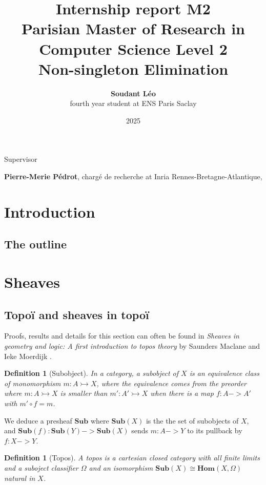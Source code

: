 \documentclass{article}
\title{Internship report M2\\ Parisian Master of Research in Computer Science Level 
2\vspace{1cm}\\  Non-singleton Elimination\\}
\author{\textbf{Soudant L\'eo}\\ fourth year student at ENS Paris Saclay}
\date{2025}
\newtheorem{definition}[theorem]{Definition}
\newcommand{\0}{\mathbf{0}}
\newcommand{\1}{\mathbf{1}}
\newcommand{\mono}{\rightarrowtail}
\begin{document}
\begin{titlepage}
    \maketitle
    \centering
    Supervisor
    
    \textbf{Pierre-Merie P\'edrot}, chargé de recherche at Inria Rennes-Bretagne-Atlantique, 

\end{titlepage}

\begin{abstract}
\end{abstract}
\tableofcontents
\newpage


\section{Introduction}




\subsection{The outline}

\section{Sheaves}
\subsection{Topoï and sheaves in topoï}


Proofs, results and details for this section can often be found in \emph{Sheaves in geometry and logic: A first introduction to topos theory} by Saunders Maclane and Ieke Moerdijk \cite{maclane2012sheaves}.

\begin{definition}[Subobject]
    In a category, a \emph{subobject} of $X$ is an equivalence class of monomorphism $m : A \mono X$, where the equivalence comes from the preorder where $ m : A \mono X $ is smaller than $ m' : A' \mono X$ when there is a map $f : A -> A'$ with $ m' \circ f = m$.
\end{definition}

We deduce a presheaf $\mathbf{Sub}$ where $\mathbf{Sub}(X)$ is the the set of subobjects of $X$, and $\mathbf{Sub}(f) : \mathbf{Sub}(Y) -> \mathbf{Sub}(X)$ sends $m : A -> Y$ to its pullback by $f : X -> Y $. 

\begin{definition}[Topos]
    A \emph{topos} is a cartesian closed category with all finite limits and a suboject \emph{classifier} $\Omega$ and an isomorphism $\mathbf{Sub}(X)\cong \mathbf{Hom}(X, \Omega)$ natural in $X$.
\end{definition}
\end{document}
